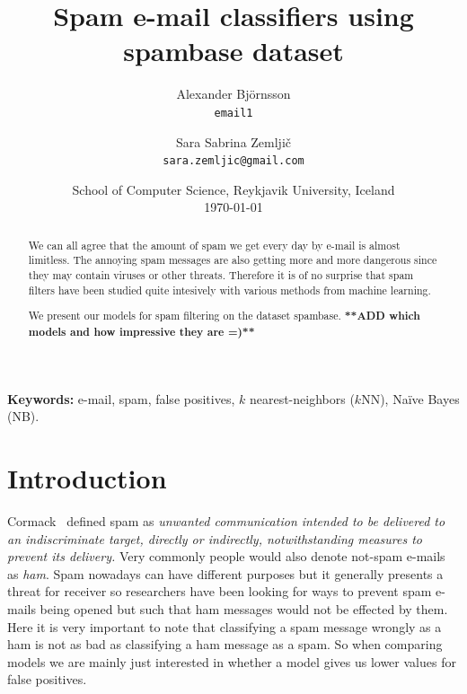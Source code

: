 \documentclass[11pt,a4paper]{article}
\begin{document}
\title{Spam e-mail classifiers using spambase dataset}

\author{
	Alexander Bj\"ornsson\\
	{\tt email1}
\and
	Sara Sabrina Zemlji\v c \\
	{\tt sara.zemljic@gmail.com}
}

\date{{\small School of Computer Science, Reykjavik University, Iceland}\\
\medskip
{\small \today}}
\maketitle

\begin{abstract}
We can all agree that the amount of spam we get every day by e-mail is almost limitless. The annoying spam messages are also getting more and more dangerous since they may contain viruses or other threats. Therefore it is of no surprise that spam filters have been studied quite intesively with various methods from machine learning.

We present our models for spam filtering on the dataset spambase. \textbf{**ADD which models and how impressive they are =)**}
\end{abstract}

\textbf{Keywords:} e-mail, spam, false positives, $k$ nearest-neighbors ($k$NN), Na\"ive Bayes (NB).

\section{Introduction}

Cormack~\cite[p.2]{Cormack-2006} defined spam as \textit{unwanted communication intended to be delivered to an indiscriminate target, directly or indirectly, notwithstanding measures to prevent its delivery.} Very commonly people would also denote not-spam e-mails as {\em ham}.
Spam nowadays can have different purposes but it generally presents a threat for receiver so researchers have been looking for ways to prevent spam e-mails being opened but such that ham messages would not be effected by them. 
Here it is very important to note that classifying a spam message wrongly as a ham is not as bad as classifying a ham message as a spam. So when comparing models we are mainly just interested in whether a model gives us lower values for false positives.
\end{document}
